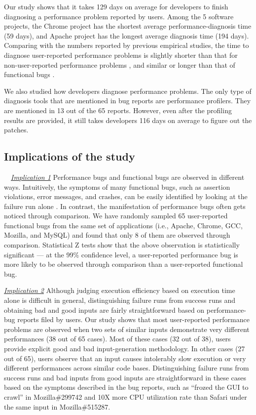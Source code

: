 Our study shows that it takes 129 days on average for developers to finish
diagnosing a performance problem reported by users.
Among the 5 software projects, the Chrome project has the shortest average
performance-diagnosis time (59 days), and Apache project has the longest
average diagnosis time (194 days).
Comparing with the numbers reported by previous empirical studies,
the time to diagnose user-reported performance problems is slightly shorter
than that for non-user-reported performance problems \cite{PerfBug},
and similar or longer than that of 
functional bugs \cite{characteristics.asplos08,PerfBug}. 

We also studied how developers diagnose performance problems.
The only type of diagnosis tools that are mentioned in bug reports are
performance profilers. They are mentioned in 13 out of the 65 reports.
However, even after the profiling results are provided, it still takes
developers 116 days on average to figure out the patches.


\subsection{Implications of the study}
\label{sec:study_imp}

\ \ \underline{\textit{Implication 1}}
Performance bugs and functional bugs are observed in different ways.
Intuitively, the symptoms of many functional bugs, such as assertion violations,
error messages, and crashes, can be easily identified by looking
at the failure run alone \citep{LiASID06}.
In contrast, the manifestation
of performance bugs often gets noticed through comparison.
We have randomly sampled 65 user-reported functional bugs from the same set
of applications (i.e., Apache, Chrome, GCC, Mozilla, and MySQL) and found that
only 8 of them are observed through comparison.
Statistical Z tests \cite{ztest} show that the above observation is 
statistically
significant --- at the 99\% confidence level, 
a user-reported performance bug is more likely to be observed through 
comparison than a user-reported functional bug.

\underline{\textit{Implication 2}}
Although judging execution efficiency based on execution time alone 
is difficult in
general, distinguishing failure runs from success runs and obtaining bad and good
inputs are fairly straightforward based on performance-bug reports filed by 
users.
Our study shows that most user-reported performance problems are observed when 
two sets of similar inputs demonstrate very different performances (38 out of 
65 cases). 
Most of these cases (32 out of 38), users provide explicit good and bad 
input-generation methodology. 
In other cases (27 out of 65),
users observe that an input causes intolerably slow execution or very different
performances across similar code bases. Distinguishing
failure runs from success runs and bad inputs from good inputs are 
straightforward in these cases based on the symptoms described
in the bug reports, such as ``frozed the GUI to
crawl'' in Mozilla\#299742 and 10X more CPU utilization rate than Safari 
under the same input in Mozilla\#515287. 

